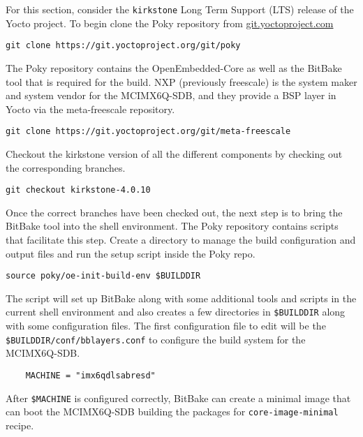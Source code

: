 For this section, consider the \texttt{kirkstone} Long Term Support (LTS) release of the Yocto project. To begin clone the Poky repository from \href{https://git.yoctoproject.com}{git.yoctoproject.com}

\begin{verbatim}
git clone https://git.yoctoproject.org/git/poky
\end{verbatim}

The Poky repository contains the OpenEmbedded-Core as well as the BitBake tool that is required for the build. NXP (previously freescale) is the system maker and system vendor for the MCIMX6Q-SDB, and they provide a BSP layer in Yocto via the meta-freescale repository.

\begin{verbatim}
git clone https://git.yoctoproject.org/git/meta-freescale
\end{verbatim}

Checkout the kirkstone version of all the different components by checking out the corresponding branches.

\begin{verbatim}
git checkout kirkstone-4.0.10
\end{verbatim}

Once the correct branches have been checked out, the next step is to bring the BitBake tool into the shell environment. The Poky repository contains scripts that facilitate this step. Create a directory to manage the build configuration and output files and run the setup script inside the Poky repo.

\begin{verbatim}
source poky/oe-init-build-env $BUILDDIR
\end{verbatim}

The script will set up BitBake along with some additional tools and scripts in the current shell environment and also creates a few directories in \texttt{\$BUILDDIR} along with some configuration files. The first configuration file to edit will be the \texttt{\$BUILDDIR/conf/bblayers.conf} to configure the build system for the MCIMX6Q-SDB.

\begin{verbatim}
	MACHINE = "imx6qdlsabresd"
\end{verbatim}

After \texttt{\$MACHINE} is configured correctly, BitBake can create a minimal image that can boot the MCIMX6Q-SDB building the packages for \texttt{core-image-minimal} recipe.

